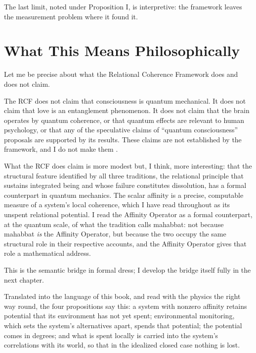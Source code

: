 The last limit, noted under Proposition I, is interpretive: the framework leaves the measurement problem where it found it.


\section{What This Means Philosophically}
\label{sec:ch13-philosophical}

Let me be precise about what the Relational Coherence Framework does and does not claim.

The RCF does not claim that consciousness is quantum mechanical. It does not claim that love is an entanglement phenomenon. It does not claim that the brain operates by quantum coherence, or that quantum effects are relevant to human psychology, or that any of the speculative claims of ``quantum consciousness'' proposals are supported by its results. These claims are not established by the framework, and I do not make them \citep{AdamsRCT}.

What the RCF does claim is more modest but, I think, more interesting: that the structural feature identified by all three traditions, the relational principle that sustains integrated being and whose failure constitutes dissolution, has a formal counterpart in quantum mechanics. The scalar affinity is a precise, computable measure of a system's local coherence, which I have read throughout as its unspent relational potential. I read the Affinity Operator as a formal counterpart, at the quantum scale, of what the \bahai tradition calls mahabbat: not because mahabbat \emph{is} the Affinity Operator, but because the two occupy the same structural role in their respective accounts, and the Affinity Operator gives that role a mathematical address.

This is the semantic bridge in formal dress; I develop the bridge itself fully in the next chapter.

Translated into the language of this book, and read with the physics the right way round, the four propositions say this: a system with nonzero affinity retains potential that its environment has not yet spent; environmental monitoring, which sets the system's alternatives apart, spends that potential; the potential comes in degrees; and what is spent locally is carried into the system's correlations with its world, so that in the idealized closed case nothing is lost.

